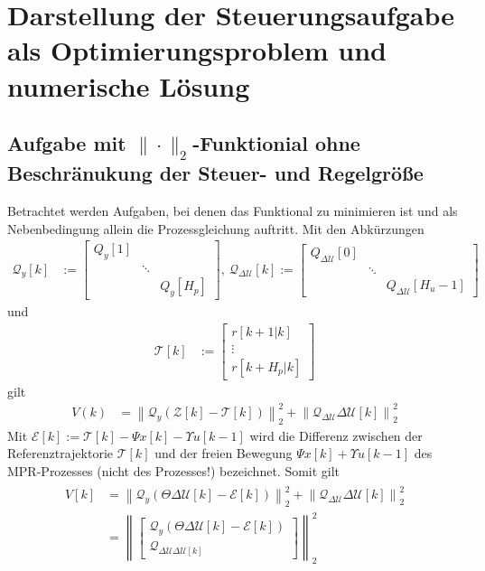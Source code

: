 \section{Darstellung der Steuerungsaufgabe als Optimierungsproblem und numerische Lösung}
\subsection{Aufgabe mit $\|\cdot\|_2$-Funktionial ohne Beschränukung der Steuer- und Regelgröße}
\label{subsec:aufgabe_quad_ohne_beschr}
Betrachtet werden Aufgaben, bei denen das Funktional  zu minimieren ist und als Nebenbedingung allein die Prozessgleichung
 auftritt.
Mit den Abkürzungen
\begin{align*}
	\mathcal{Q}_{y}[k] & :=\begin{bmatrix}
	Q_{y}[1]	& 			& 	\\
				& \ddots	&	\\
				&			& Q_{y}[H_p]
	\end{bmatrix},\ \mathcal{Q}_{\Delta\mathcal{U}}[k]:= \begin{bmatrix}
	Q_{\Delta\mathcal{U}}[0]	&			&	\\
								& \ddots	& 	\\
								&			& Q_{\Delta\mathcal{U}}[H_u-1]
	\end{bmatrix}
\end{align*}
und
\begin{align*}
	\mathcal{T}[k] & := \begin{bmatrix}
	r[k+1|k]\\
	\vdots\\
	r[k+H_p|k]
	\end{bmatrix}
\end{align*}
gilt
\begin{align}
	V(k) & = \left\| \mathcal{Q}_{y}\left(\mathcal{Z}[k]-\mathcal{T}[k]\right) \right\|_2^2 + \left\| \mathcal{Q}_{\Delta\mathcal{U}}\Delta\mathcal{U}[k] \right\|_2^2
\end{align}
Mit $\mathcal{E}[k]:=\mathcal{T}[k]-\Psi x[k]-\Upsilon u[k-1]$ wird die Differenz zwischen der Referenztrajektorie $\mathcal{T}[k]$ und der freien Bewegung $\Psi x[k]+\Upsilon u[k-1]$
des \ac{MPR}-Prozesses (nicht des Prozesses!) bezeichnet. Somit gilt
\begin{align}
\begin{split}\label{eqn:kap_4_quad_kostenfunktional_ohne_beschr}
	V[k] & = \left\| \mathcal{Q}_{y}\left(\Theta\Delta\mathcal{U}[k]-\mathcal{E}[k]\right) \right\|_2^2 + \left\| \mathcal{Q}_{\Delta\mathcal{U}}\Delta\mathcal{U}[k] \right\|_2^2\\
	& = \left\| \begin{bmatrix} \mathcal{Q}_y\left(\Theta\Delta\mathcal{U}[k] - \mathcal{E}[k]\right)\\ \mathcal{Q}_{\Delta\mathcal{U}\Delta\mathcal{U}[k]} \end{bmatrix}
	\right\|_2^2
\end{split}
\end{align}
